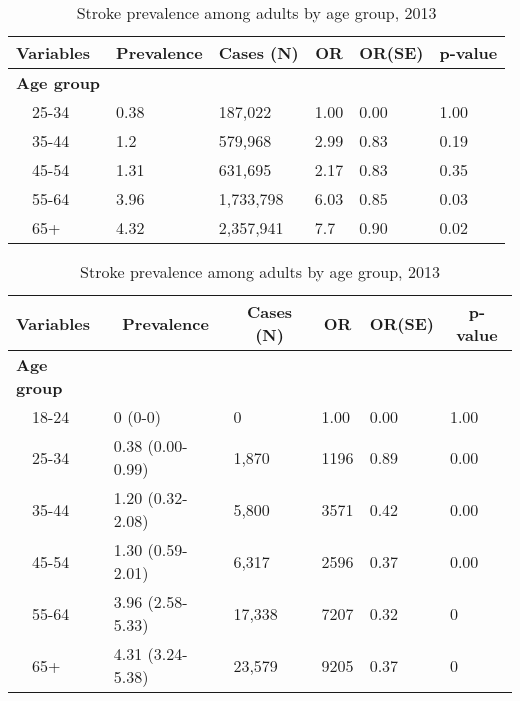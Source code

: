 \begin{table}[H]
\caption{Stroke prevalence among adults by age group, 2013\label{tab:age.reduced}} 
\begin{center}
\begin{tabular}{llllll}
\hline\hline
\multicolumn{1}{l}{Variables}&\multicolumn{1}{c}{Prevalence}&\multicolumn{1}{c}{Cases (N)}&\multicolumn{1}{c}{OR}&\multicolumn{1}{c}{OR(SE)}&\multicolumn{1}{c}{p-value}\tabularnewline
\hline
{\bfseries Age group}&&&&&\tabularnewline
~~25-34&0.38&  187,022&1.00&0.00&1.00\tabularnewline
~~35-44&1.2&  579,968&2.99&0.83&0.19\tabularnewline
~~45-54&1.31&  631,695&2.17&0.83&0.35\tabularnewline
~~55-64&3.96&1,733,798&6.03&0.85&0.03\tabularnewline
~~65+&4.32&2,357,941&7.7&0.90&0.02\tabularnewline
\hline
\end{tabular}\end{center}

\end{table}
\begin{table}[H]
\caption{Stroke prevalence  among adults by age group, 2013\label{tab:age.Stroke.2013}} 
\begin{center}
\begin{tabular}{llllll}
\hline\hline
\multicolumn{1}{l}{Variables}&\multicolumn{1}{c}{Prevalence}&\multicolumn{1}{c}{Cases (N)}&\multicolumn{1}{c}{OR}&\multicolumn{1}{c}{OR(SE)}&\multicolumn{1}{c}{p-value}\tabularnewline
\hline
{\bfseries Age group}&&&&&\tabularnewline
~~18-24&0 (0-0)&     0&1.00&0.00&1.00\tabularnewline
~~25-34&0.38 (0.00-0.99)& 1,870&1196&0.89&0.00\tabularnewline
~~35-44&1.20 (0.32-2.08)& 5,800&3571&0.42&0.00\tabularnewline
~~45-54&1.30 (0.59-2.01)& 6,317&2596&0.37&0.00\tabularnewline
~~55-64&3.96 (2.58-5.33)&17,338&7207&0.32&0\tabularnewline
~~65+&4.31 (3.24-5.38)&23,579&9205&0.37&0\tabularnewline
\hline
\end{tabular}\end{center}

\end{table}



